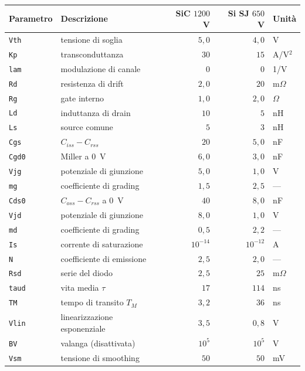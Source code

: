 \documentclass[11pt,a4paper]{article}
\newcommand{\ssc}[1]{\texttt{#1}}
\begin{document}
\begin{center}
\begin{tabular}{llrrl}
\toprule
Parametro & Descrizione & SiC $1200$~V & Si SJ $650$~V & Unità \\
\midrule
\ssc{Vth}  & tensione di soglia            & $5{,}0$   & $4{,}0$   & V \\
\ssc{Kp}   & transconduttanza              & $30$      & $15$      & A/V$^2$ \\
\ssc{lam}  & modulazione di canale         & $0$       & $0$       & 1/V \\
\ssc{Rd}   & resistenza di drift           & $2{,}0$   & $20$      & m$\Omega$ \\
\ssc{Rg}   & gate interno                  & $1{,}0$   & $2{,}0$   & $\Omega$ \\
\ssc{Ld}   & induttanza di drain           & $10$      & $5$       & nH \\
\ssc{Ls}   & source comune                 & $5$       & $3$       & nH \\
\midrule
\ssc{Cgs}  & $C_{iss}-C_{rss}$             & $20$      & $5{,}0$   & nF \\
\ssc{Cgd0} & Miller a $0$~V                & $6{,}0$   & $3{,}0$   & nF \\
\ssc{Vjg}  & potenziale di giunzione       & $5{,}0$   & $1{,}0$   & V \\
\ssc{mg}   & coefficiente di grading       & $1{,}5$   & $2{,}5$   & --- \\
\ssc{Cds0} & $C_{oss}-C_{rss}$ a $0$~V     & $40$      & $8{,}0$   & nF \\
\ssc{Vjd}  & potenziale di giunzione       & $8{,}0$   & $1{,}0$   & V \\
\ssc{md}   & coefficiente di grading       & $0{,}5$   & $2{,}2$   & --- \\
\midrule
\ssc{Is}   & corrente di saturazione       & $10^{-14}$& $10^{-12}$& A \\
\ssc{N}    & coefficiente di emissione     & $2{,}5$   & $2{,}0$   & --- \\
\ssc{Rsd}  & serie del diodo               & $2{,}5$   & $25$      & m$\Omega$ \\
\ssc{taud} & vita media $\tau$             & $17$      & $114$     & ns \\
\ssc{TM}   & tempo di transito $T_M$       & $3{,}2$   & $36$      & ns \\
\ssc{Vlin} & linearizzazione esponenziale  & $3{,}5$   & $0{,}8$   & V \\
\midrule
\ssc{BV}   & valanga (disattivata)         & $10^{5}$  & $10^{5}$  & V \\
\ssc{Vsm}  & tensione di smoothing         & $50$      & $50$      & mV \\
\bottomrule
\end{tabular}
\end{center}
\end{document}

